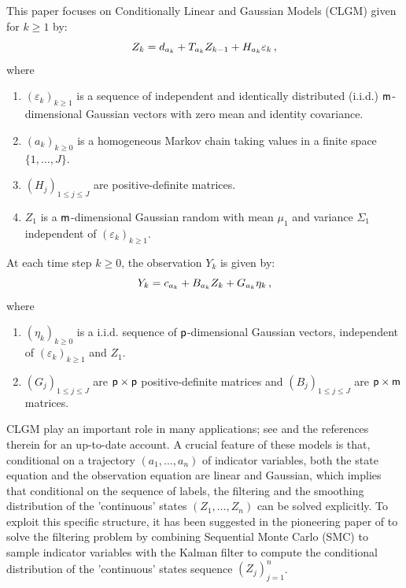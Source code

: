 This paper focuses on  Conditionally Linear and Gaussian Models (CLGM) given for $k\ge 1$ by:
\begin{equation}
\label{eq:model:state}
Z_k = d_{a_{k}} + T_{a_{k}}Z_{k-1}+H_{a_{k}}\varepsilon_k\,,
\end{equation}
where
\begin{enumerate}[-]
\item $(\varepsilon_k)_{k\ge 1}$ is a sequence of independent and identically distributed (i.i.d.) $\mathsf{m}$-dimensional Gaussian vectors with zero mean and identity covariance.
\item $(a_k)_{k\ge 0}$ is a homogeneous Markov chain taking values in a finite space $\{1,\ldots,J\}$.  %
\item $(H_j)_{1\le j\le J}$ are positive-definite matrices.
\item $Z_1$ is a $\mathsf{m}$-dimensional Gaussian random with mean $\mu_1$ and variance $\Sigma_1$ independent of $(\varepsilon_k)_{k\ge 1}$.
\end{enumerate}
At each time step $k\ge 0$, the observation $Y_k$ is given by:
\begin{equation}
\label{eq:model:obs}
Y_k = c_{a_k} + B_{a_k}Z_k + G_{a_k}\eta_k\,,
\end{equation}
where
\begin{enumerate}[-]
\item $(\eta_k)_{k\ge 0}$ is a i.i.d. sequence of $\mathsf{p}$-dimensional Gaussian vectors, independent of $(\varepsilon_k)_{k\ge 1}$ and $Z_1$.
\item $(G_j)_{1\le j \le J}$ are $\mathsf{p} \times \mathsf{p}$ positive-definite matrices and $(B_j)_{1\le j \le J}$ are $\mathsf{p} \times \mathsf{m}$ matrices.
\end{enumerate}
CLGM play an important role in many applications; see \cite{sarkka:2013} and the references therein for an up-to-date account. A crucial feature of these models is that, conditional on a trajectory $(a_1,\ldots,a_n)$ of indicator variables, both the state equation and the observation equation are linear and Gaussian, which implies that conditional on the sequence of labels, the filtering and the smoothing distribution of the 'continuous' states $(Z_1,\dots,Z_n)$ can be solved explicitly. To exploit this specific structure, it has been suggested in the pioneering paper of \cite{chen:liu:2000,doucet:godsill:andrieu:2000} to solve the filtering problem by combining Sequential Monte Carlo (SMC) to sample indicator variables with the Kalman filter to compute the conditional distribution of the 'continuous' states sequence $(Z_j)_{j=1}^n$.
